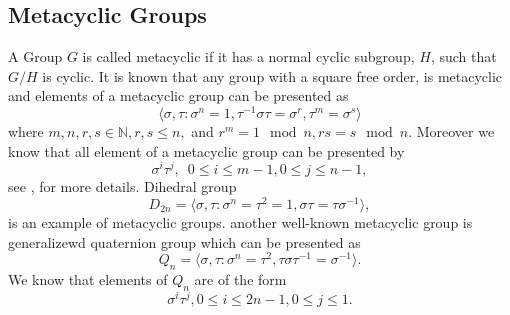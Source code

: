 \subsection{Metacyclic Groups}

A Group $G$ is called metacyclic if it has a normal cyclic subgroup, $H$, such that $G/H$ is cyclic. It is known that any group
with a square free order, is metacyclic and elements of a metacyclic group can be presented as 
\begin{equation}\label{eq:metacyclic}
\langle \sigma,\tau: \sigma^n = 1, \tau^{-1}\sigma \tau = \sigma^r, \tau ^m = \sigma^s \rangle
\end{equation}
where $m,n,r,s \in \mathbb{N}, r,s \leq n,$ and $r^m = 1 \mod n , rs = s \mod n$. Moreover we know that all element of a metacyclic
 group can be presented by $$\sigma^i \tau^j, \,\,\, 0\leq i \leq m-1, 0\leq j \leq n-1,$$ 
see \cite[P.88, Proposition 1]{Johnson}, \cite[P.334]{Curtis} for more details. Dihedral group 
$$D_{2n} = \langle \sigma,\tau: \sigma^n =\tau^2 = 1, \sigma \tau = \tau \sigma^{-1} \rangle, $$
is an example of metacyclic groups. another well-known metacyclic group is generalizewd quaternion
 group which can be presented as
 $$Q_n = \langle \sigma,\tau: \sigma^n =\tau^2, \tau \sigma \tau^{-1} = \sigma^{-1} \rangle.$$
 We know that elements of $Q_n$ are of the form 
 $$\sigma^i\tau^j, 0 \leq i \leq 2n-1 , 0\leq j \leq 1.$$
 
